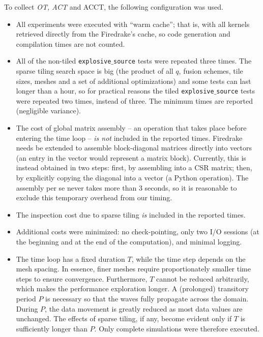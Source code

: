 To collect {\em OT, ACT} and ACCT, the following configuration was used.
\begin{itemize}
\item All experiments were executed with ``warm cache''; that is, with all kernels retrieved directly from the Firedrake's cache, so code generation and compilation times are not counted.
\item All of the non-tiled {\tt explosive$\_$source} tests were repeated three times. The sparse tiling search space is big (the product of all $q$, fusion schemes, tile sizes, meshes and a set of additional optimizations) and some tests can last longer than a hour, so for practical reasons the tiled {\tt explosive$\_$source} tests were repeated two times, instead of three. The minimum times are reported (negligible variance).
\item The cost of global matrix assembly -- an operation that takes place before entering the time loop -- {\it is not} included in the reported times. Firedrake needs be extended to assemble block-diagonal matrices directly into vectors (an entry in the vector would represent a matrix block). Currently, this is instead obtained in two steps: first, by assembling into a CSR matrix; then, by explicitly copying the diagonal into a vector (a Python operation). The assembly per se never takes more than 3 seconds, so it is reasonable to exclude this temporary overhead from our timing.
\item The inspection cost due to sparse tiling {\it is} included in the reported times.
\item Additional costs were minimized: no check-pointing, only two I/O sessions (at the beginning and at the end of the computation), and minimal logging.
\item The time loop has a fixed duration $T$, while the time step depends on the mesh spacing. In essence, finer meshes require proportionately smaller time steps to ensure convergence. Furthermore, $T$ cannot be reduced arbitrarily, which makes the performance exploration longer. A (prolonged) transitory period $P$ is necessary so that the waves fully propagate across the domain. During $P$, the data movement is greatly reduced as most data values are unchanged. The effects of sparse tiling, if any, become evident only if $T$ is sufficiently longer than $P$. Only complete simulations were therefore executed.
\end{itemize}



